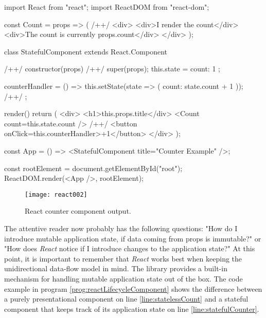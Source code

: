 \begin{program}
\caption{Simple example of a \emph{React} component and its usage.} 
\label{prog:reactStateful}
\begin{JsCode}
import React from "react";
import ReactDOM from "react-dom";

const Count = props => ( /+\label{line:statelessCount}+/
  <div>
    <div>I render the count</div>
    <div>The count is currently {props.count}</div>
  </div>
);

class StatefulComponent extends React.Component { /+\label{line:statefulCounter}+/
  constructor(props) { /+\label{line:statefulConstructor}+/
    super(props);
    this.state = {
      count: 1
    };
  }

  counterHandler = () => {
    this.setState(state => ({ count: state.count + 1 })); /+\label{line:setState}+/
  };

  render() {
    return (
      <div>
        <h1>{this.props.title}</div>
        <Count count={this.state.count} /> /+\label{line:currentStateUsage}+/
        <button onClick={this.counterHandler}>+1</button>
      </div>
    );
  }
}

const App = () => <StatefulComponent title={"Counter Example"} />;

const rootElement = document.getElementById("root");
ReactDOM.render(<App />, rootElement);
\end{JsCode}
\end{program}

\begin{figure}
  \centering
  \texttt{[image: react002]}
  \caption{React counter component output.}
  \label{fig:reactCounterComponent}
\end{figure}

The attentive reader now probably has the following questions: "How do I introduce mutable application state, if data coming from props is immutable?" or "How does \emph{React} notice if I introduce changes to the application state?" At this point, it is important to remember that \emph{React} works best when keeping the unidirectional data-flow model in mind. The library provides a built-in mechanism for handling mutable application state out of the box. The code example in program \ref{prog:reactLifecycleComponent} shows the difference between a purely presentational component on line \ref{line:statelessCount} and a stateful component that keeps track of its application state on line \ref{line:statefulCounter}.

